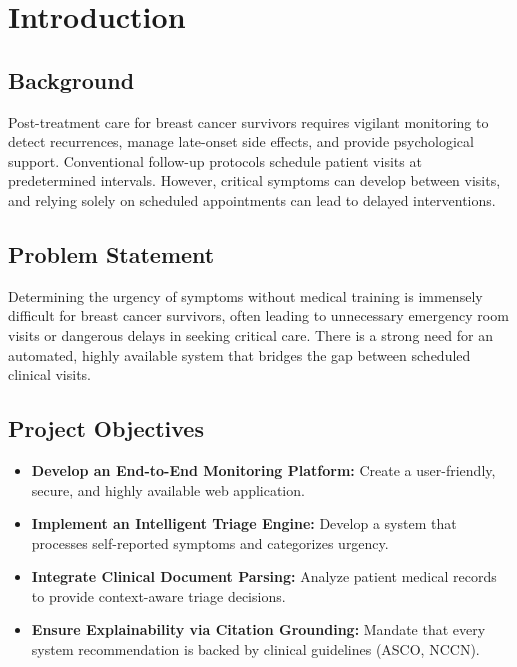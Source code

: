 \documentclass[12pt,a4paper]{report}
\begin{document}
\tableofcontents
\listoffigures

\newpage
{}

\chapter{Introduction}
\section{Background}
Post-treatment care for breast cancer survivors requires vigilant monitoring to detect recurrences, manage late-onset side effects, and provide psychological support. Conventional follow-up protocols schedule patient visits at predetermined intervals. However, critical symptoms can develop between visits, and relying solely on scheduled appointments can lead to delayed interventions.

\section{Problem Statement}
Determining the urgency of symptoms without medical training is immensely difficult for breast cancer survivors, often leading to unnecessary emergency room visits or dangerous delays in seeking critical care. There is a strong need for an automated, highly available system that bridges the gap between scheduled clinical visits.

\section{Project Objectives}
\begin{itemize}
    \item \textbf{Develop an End-to-End Monitoring Platform:} Create a user-friendly, secure, and highly available web application.
    \item \textbf{Implement an Intelligent Triage Engine:} Develop a system that processes self-reported symptoms and categorizes urgency.
    \item \textbf{Integrate Clinical Document Parsing:} Analyze patient medical records to provide context-aware triage decisions.
    \item \textbf{Ensure Explainability via Citation Grounding:} Mandate that every system recommendation is backed by clinical guidelines (ASCO, NCCN).
\end{itemize}
\end{document}

